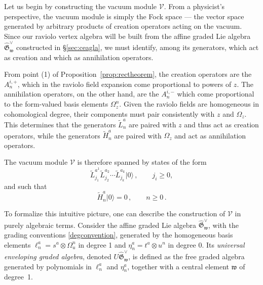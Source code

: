 \documentclass[11pt]{amsart}
\numberwithin{equation}{section}
\numberwithin{figure}{section}
\numberwithin{table}{section}
\theoremstyle{thm}
\numberwithin{equation}{subsection}
\theoremstyle{definition}
\theoremstyle{rem}
\begin{document}
Let us begin by constructing the vacuum module $\mathcal{V}$. From a physicist’s perspective, the vacuum module is simply the Fock space — the vector space generated by arbitrary products of creation operators acting on the vacuum. Since our raviolo vertex algebra will be built from the affine graded Lie algebra $\widehat{\mathfrak{G}}_{\mathfrak{w}}^\vee$ constructed in \S \ref{sec:ceagla}, we must identify, among its generators, which act as creation and which as annihilation operators.

From point (1) of Proposition~\ref{prop:rectheorem}, the creation operators are the $A^{i,+}_n$, which in the raviolo field expansion come proportional to powers of $z$. The annihilation operators, on the other hand, are the $A^{i,-}_n$ which come proportional to the form-valued basis elements $\Omega_z^n$. Given the raviolo fields are homogeneous in cohomological degree, their components must pair consistently with $z$ and $\Omega_z$. This determines that the generators $\tilde{L}_n^a$ are paired with $z$ and thus act as creation operators, while the generators $\tilde{H}_n^a$ are paired with $\Omega_z$ and act as annihilation operators.

The vacuum module $\mathcal{V}$ is therefore spanned by states of the form  
\begin{equation}
    \tilde{L}_{j_1}^{a^1} \tilde{L}_{j_2}^{a_2} \cdots \tilde{L}_{j_k}^{a_k} |0\rangle\,, 
    \qquad j_i \geq 0,
\end{equation}
and such that  
\begin{equation}
    \tilde{H}_n^a |0\rangle = 0\,, 
    \qquad n \ge 0\,.
\end{equation}

To formalize this intuitive picture, one can describe the construction of $\mathcal{V}$ in purely algebraic terms.  
Consider the affine graded Lie algebra $\widehat{\mathfrak{G}}^\vee_{\mathfrak{w}}$, with the grading conventions \eqref{degconvention}, generated by the homogeneous basis elements $\ell^a_n = s^a \otimes \Omega_u^n $ in degree 1 and $\eta^a_n= t^a\otimes u^n$ in degree 0. Its \textit{universal enveloping graded algebra}, denoted $U\widehat{\mathfrak{G}}_{\mathfrak{w}}^\vee$, is defined as the free graded algebra generated by polynomials in $\ell_n^a$ and $\eta_n^a$, together with a central element $\mathfrak{w}$ of degree~1.  
\end{document}

